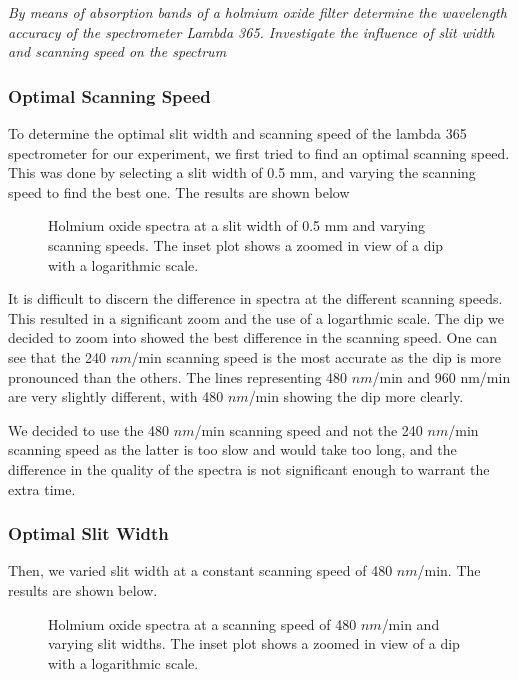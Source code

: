 \documentclass{article}
\begin{document}
\textit{By means of absorption bands of a holmium oxide filter determine the wavelength
accuracy of the spectrometer Lambda 365. Investigate the influence of slit width and
scanning speed on the spectrum}

\subsubsection{Optimal Scanning Speed}

To determine the optimal slit width and scanning speed of the lambda 365 spectrometer for our experiment, we first tried to find an optimal scanning speed. This was done by selecting a slit width of 0.5 mm, and varying the scanning speed to find the best one. The results are shown below

\begin{figure}[h]
	\centering
	\scalebox{0.75}{}
	\caption{Holmium oxide spectra at a slit width of 0.5 mm and varying scanning speeds. The inset plot shows a zoomed in view of a dip with a logarithmic scale.}
	\label{fig:ScanningSpeeds}
\end{figure}

It is difficult to discern the difference in spectra at the different scanning speeds. This resulted in a significant zoom and the use of a logarthmic scale.
The dip we decided to zoom into showed the best difference in the scanning speed. One can see that the 240 $nm$/min scanning speed is the most accurate as the dip is more pronounced than the others. The lines representing 480 $nm$/min and 960 nm/min are very slightly different, with 480 $nm$/min showing the dip more clearly.

We decided to use the 480 $nm$/min scanning speed and not the 240 $nm$/min scanning speed as the latter is too slow and would take too long, and the difference in the quality of the spectra is not significant enough to warrant the extra time.

\pagebreak{}

\subsubsection{Optimal Slit Width}

Then, we varied slit width at a constant scanning speed of 480 $nm$/min. The results are shown below.

\begin{figure}[h!]
	\centering
	\scalebox{0.70}{}
	\caption{Holmium oxide spectra at a scanning speed of 480 $nm$/min and varying slit widths. The inset plot shows a zoomed in view of a dip with a logarithmic scale.}
	\label{fig:SlitWidths}
\end{figure}
\end{document}
